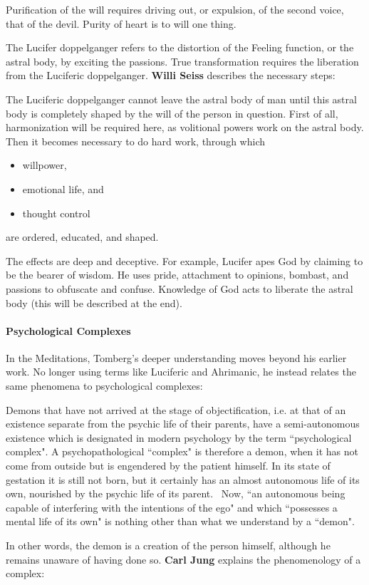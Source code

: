 Purification of the will requires driving out, or expulsion, of the second voice, that of the devil. Purity of heart is to will one thing.

The Lucifer doppelganger refers to the distortion of the Feeling function, or the astral body, by exciting the passions. True transformation requires the liberation from the Luciferic doppelganger. \textbf{Willi Seiss} describes the necessary steps:

\begin{quotex}
The Luciferic doppelganger cannot leave the astral body of man until this astral body is completely shaped by the will of the person in question. First of all, harmonization will be required here, as volitional powers work on the astral body. Then it becomes necessary to do hard work, through which
\begin{itemize}
\item willpower, 
\item emotional life, and 
\item thought control 
\end{itemize}
are ordered, educated, and shaped. 

\end{quotex}
The effects are deep and deceptive. For example, Lucifer apes God by claiming to be the bearer of wisdom. He uses pride, attachment to opinions, bombast, and passions to obfuscate and confuse. Knowledge of God acts to liberate the astral body (this will be described at the end).

\paragraph{Psychological Complexes}
In the Meditations, Tomberg's deeper understanding moves beyond his earlier work. No longer using terms like Luciferic and Ahrimanic, he instead relates the same phenomena to psychological complexes:

\begin{quotex}
Demons that have not arrived at the stage of objectification, i.e. at that of an existence separate from the psychic life of their parents, have a semi-autonomous existence which is designated in modern psychology by the term ``psychological complex". A psychopathological ``complex" is therefore a demon, when it has not come from outside but is engendered by the patient himself. In its state of gestation it is still not born, but it certainly has an almost autonomous life of its own, nourished by the psychic life of its parent.  Now, ``an autonomous being capable of interfering with the intentions of the ego" and which ``possesses a mental life of its own" is nothing other than what we understand by a ``demon". 

\end{quotex}
In other words, the demon is a creation of the person himself, although he remains unaware of having done so. \textbf{Carl Jung} explains the phenomenology of a complex:

